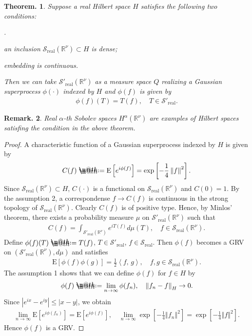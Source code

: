 \documentclass[openany, a4paper, oneside]{book}
\makeatletter
\newcounter{enum2}
\renewenvironment{enumerate}{%
\begin{list}%
{%
\arabic{enum2}.\ \,%
}%
{%
\usecounter{enum2}
\setlength{\itemindent}{0pt}%
\setlength{\leftmargin}{6pt}%
\setlength{\rightmargin}{0pt}%
\setlength{\labelsep}{0pt}%
\setlength{\labelwidth}{6pt}%
\setlength{\itemsep}{0pt}%
\setlength{\parsep}{0pt}%
\setlength{\listparindent}{0pt}%
}
}{%
\end{list}%
}
\newcommand*{\defeq}{\mathrel{\rlap{%
\raisebox{0.3ex}{$\m@th\cdot$}}%
\raisebox{-0.3ex}{$\m@th\cdot$}}%
=}
\theoremstyle{break}
\newtheorem{thm}{Theorem.}[section]
\theoremstyle{breakdefn}
\newtheorem{rem}[thm]{Remark.}
\newcommand{\abs}[1]{\left|#1\right|}
\newcommand{\norm}[1]{\left\Vert#1\right\Vert}
\newcommand{\sqbk}[1]{\left[#1\right]}
\newcommand{\bkt}[2]{\left\langle#1,\,#2\right\rangle}
\newcommand{\bbRnu}{\mathbb{R}^{\nu}}
\newcommand{\E}[1]{\rmE\sqbk{#1}}
\newcommand{\realtempereddist}{\mathcal{S}'_{\mathrm{real}}}
\newcommand{\realrapiddecrease}{\mathcal{S}_{\mathrm{real}}}
\newcommand{\rmE}{\mathrm{E}}
\makeatother
\begin{document}
\begin{thm}
 Suppose a real Hilbert space $H$ satisfies the following two conditions:
\begin{enumerate}
\item an inclusion $\realrapiddecrease (\bbRnu) \subset H$ is dense;
\item embedding is continuous.
\end{enumerate}
 Then we can take $\realtempereddist (\bbRnu)$ as a measure space $Q$ realizing a Gaussian superprocess $\phi (\cdot)$ indexed by $H$
 and $\phi (f)$ is given by
 \begin{align}
  \phi (f) (T) = T (f), \quad T \in \realtempereddist.
 \end{align}
\end{thm}
\begin{rem}
 Real $\alpha$-th Sobolev spaces $H^{\alpha}(\bbRnu)$ are examples of Hilbert spaces satisfing the condition in the above theorem.
\end{rem}
\begin{proof}
 A characteristic function of a Gaussian superprocess indexed by $H$ is given by
 \begin{align}
  C (f) \defeq \E{e^{i \phi (f)}} = \exp \sqbk{- \frac{1}{4} \norm{f}^2}.
 \end{align}
 Since $\realrapiddecrease (\bbRnu) \subset H$, $C (\cdot)$ is a functional on $\realrapiddecrease (\bbRnu)$ and $C (0)=1$.
 By the assumption 2, a correspondense $f \to C (f)$ is continuous in the strong topology of $\realrapiddecrease (\bbRnu)$.
 Clearly $C (f)$ is of positive type.
 Hence, by Minlos' theorem, there exists a probability measure $\mu$ on $\realtempereddist (\bbRnu)$ such that
 \begin{align}
  C (f) = \int_{\realtempereddist (\bbRnu)} e^{i T (f)} d \mu (T), \quad f \in \realrapiddecrease (\bbRnu).
 \end{align}
 Define $\phi (f) (T) \defeq T (f)$, $T \in \realtempereddist$, $f \in \realrapiddecrease$.
 Then $\phi (f)$ becomes a GRV on $(\realtempereddist (\bbRnu), d \mu)$ and satisfies
 \begin{align}
  \E{\phi (f) \phi (g)} = \frac{1}{2} \bkt{f}{g}, \quad f, g \in \realrapiddecrease (\bbRnu).
 \end{align}
 The assumption 1 shows that we can define $\phi (f)$ for $f \in H$ by
 \begin{align}
  \phi (f) \defeq \lim_{n \to \infty} \phi (f_n), \quad \norm{f_n - f}_{H} \to 0.
 \end{align}
 Since $\abs{e^{ix} - e^{iy}} \leq \abs{x - y}$, we obtain
 \begin{align}
  \lim_{n \to \infty} \E{e^{i \phi (f_n)}}
  =
  \E{e^{i \phi (f)}}, \quad
  \lim_{n \to \infty} \exp \sqbk{- \frac{1}{4} \norm{f_n}^2}
  =
  \exp \sqbk{- \frac{1}{4} \norm{f}^2}.
 \end{align}
 Hence $\phi (f)$ is a GRV.
\end{proof}
\end{document}
